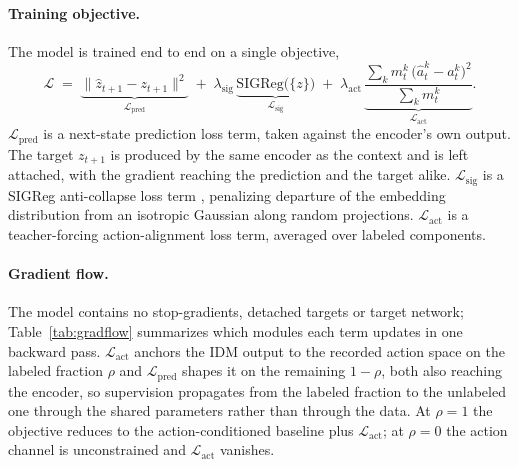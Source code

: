 \documentclass{article}
\begin{document}
\paragraph{Training objective.}
The model is trained end to end on a single objective,
\begin{equation}
  \mathcal{L}
  \;=\;
  \underbrace{\bigl\lVert \hat z_{t+1} - z_{t+1} \bigr\rVert^{2}}_{\textstyle \mathcal{L}_{\mathrm{pred}}}
  \;+\;
  \lambda_{\mathrm{sig}}\,
  \underbrace{\mathrm{SIGReg}\bigl(\{z\}\bigr)}_{\textstyle \mathcal{L}_{\mathrm{sig}}}
  \;+\;
  \lambda_{\mathrm{act}}\,
  \underbrace{\frac{\sum_{k} m_t^{k}\,\bigl(\hat{a}_t^{k} - a_t^{k}\bigr)^{2}}
                   {\sum_{k} m_t^{k}}}_{\textstyle \mathcal{L}_{\mathrm{act}}}.
  \label{eq:objective}
\end{equation}
$\mathcal{L}_{\mathrm{pred}}$ is a next-state prediction loss term, taken against
the encoder's own output. The target $z_{t+1}$ is produced by the same encoder as
the context and is left attached, with the gradient reaching the prediction and the
target alike. $\mathcal{L}_{\mathrm{sig}}$ is a SIGReg anti-collapse loss term
\cite{lejepa}, penalizing departure of the embedding distribution from an isotropic
Gaussian along random projections. $\mathcal{L}_{\mathrm{act}}$ is a
teacher-forcing action-alignment loss term, averaged over labeled components.

\paragraph{Gradient flow.}
The model contains no stop-gradients, detached targets or target network;
Table~\ref{tab:gradflow} summarizes which modules each term updates in one backward
pass. $\mathcal{L}_{\mathrm{act}}$ anchors the IDM output to the recorded action
space on the labeled fraction $\rho$ and $\mathcal{L}_{\mathrm{pred}}$ shapes it on
the remaining $1-\rho$, both also reaching the encoder, so supervision propagates
from the labeled fraction to the unlabeled one through the shared parameters rather
than through the data. At $\rho = 1$ the objective reduces to the
action-conditioned baseline plus $\mathcal{L}_{\mathrm{act}}$; at $\rho = 0$ the
action channel is unconstrained and $\mathcal{L}_{\mathrm{act}}$ vanishes.
\end{document}

